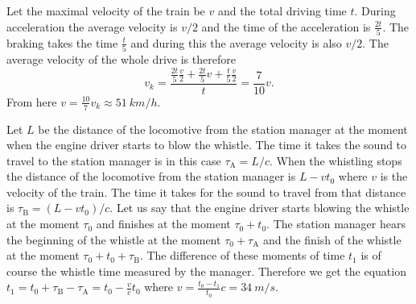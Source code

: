 \documentclass[11pt]{article}
\begin{document}

\solueng
Let the maximal velocity of the train be $v$ and the total driving time $t$. During acceleration the average velocity is $v/2$ and the time of the acceleration is $\frac{2t}{5}$. The braking takes the time $\frac{t}{5}$ and during this the average velocity is also $v/2$. The average velocity of the whole drive is therefore
$$v_k = \frac{\frac{2t}{5} \frac{v}{2}+\frac{2t}{5} v + \frac{t}{5} \frac{v}{2}}{t} = \frac{7}{10} v.$$
From here $v=\frac{10}{7}v_k \approx \SI{51}{km/h}$.
\probend
\bigskip


\solueng
Let $L$ be the distance of the locomotive from the station manager at the moment when the engine driver starts to blow the whistle. The time it takes the sound to travel to the station manager is in this case $\tau_\text{A}=L/c$. When the whistling stops the distance of the locomotive from the station manager is $L-vt_0$ where $v$ is the velocity of the train. The time it takes for the sound to travel from that distance is $\tau_\text{B}=(L-vt_0)/c$. Let us say that the engine driver starts blowing the whistle at the moment $\tau_0$ and finishes at the moment $\tau_0+t_0$. The station manager hears the beginning of the whistle at the moment $\tau_0+\tau_\text{A}$ and the finish of the whistle at the moment $\tau_0+t_0+\tau_\text{B}$. The difference of these moments of time $t_1$ is of course the whistle time measured by the manager. Therefore we get the equation $t_1 = t_0+\tau_\text{B}-\tau_\text{A} = t_0 - \frac{v}{c}t_0$ where $v = \frac{t_0-t_1}{t_0}c = \SI{34}{m/s}$.
\probend
\bigskip

\end{document}
